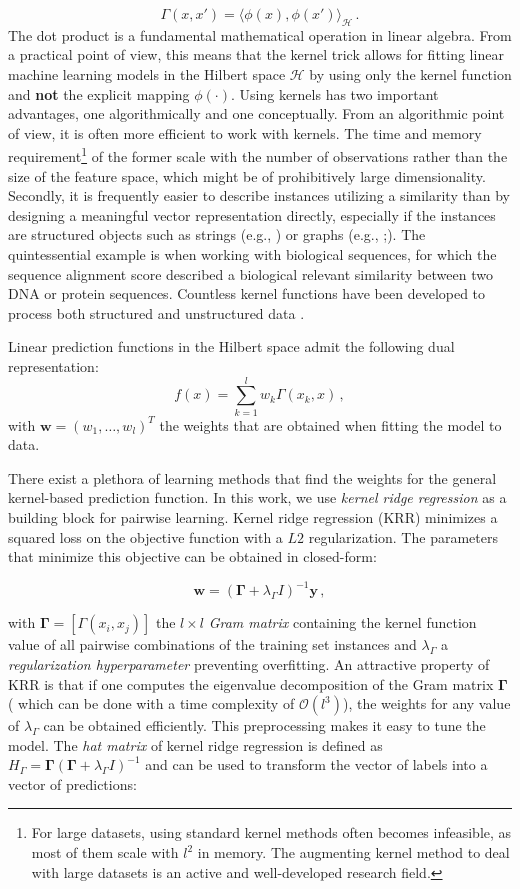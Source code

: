 \documentclass[
]{article}
\begin{document}
\[
\Gamma(x,x') = \langle \phi(x),\phi(x')\rangle_\mathcal{H}\,.
\] The dot product is a fundamental mathematical operation in linear
algebra. From a practical point of view, this means that the kernel
trick allows for fitting linear machine learning models in the Hilbert
space \(\mathcal{H}\) by using only the kernel function and \textbf{not}
the explicit mapping \(\phi(\cdot)\). Using kernels has two important
advantages, one algorithmically and one conceptually. From an
algorithmic point of view, it is often more efficient to work with
kernels. The time and memory requirement\footnote{For large datasets,
  using standard kernel methods often becomes infeasible, as most of
  them scale with \(l^2\) in memory. The augmenting kernel method to
  deal with large datasets is an active and well-developed research
  field.} of the former scale with the number of observations rather
than the size of the feature space, which might be of prohibitively
large dimensionality. Secondly, it is frequently easier to describe
instances utilizing a similarity than by designing a meaningful vector
representation directly, especially if the instances are structured
objects such as strings (e.g., \citet{Vishwanathan2004}) or graphs
(e.g., \citet{Lafferty2002};\citet{Nikolentzos2019}). The quintessential
example is when working with biological sequences, for which the
sequence alignment score described a biological relevant similarity
between two DNA or protein sequences. Countless kernel functions have
been developed to process both structured and unstructured data
\citep{Shawe-Taylor2004}.

Linear prediction functions in the Hilbert space admit the following
dual representation: \[
f(x) = \sum_{k=1}^l w_k \Gamma(x_k,x)\,,
\] with \(\mathbf{w} = (w_1,\ldots, w_l)^T\) the weights that are
obtained when fitting the model to data.

There exist a plethora of learning methods that find the weights for the
general kernel-based prediction function. In this work, we use
\emph{kernel ridge regression} as a building block for pairwise
learning. Kernel ridge regression (KRR) minimizes a squared loss on the
objective function with a \(L2\) regularization. The parameters that
minimize this objective can be obtained in closed-form:

\[
\mathbf{w} = (\mathbf{\Gamma}+\lambda_\Gamma I)^{-1}\mathbf{y}\,,
\]

with \(\mathbf{\Gamma}=[\Gamma(x_i,x_j)]\) the \(l\times l\) \emph{Gram
matrix} containing the kernel function value of all pairwise
combinations of the training set instances and \(\lambda_\Gamma\) a
\emph{regularization hyperparameter} preventing overfitting. An
attractive property of KRR is that if one computes the eigenvalue
decomposition of the Gram matrix \(\mathbf{\Gamma}\) ( which can be done
with a time complexity of \(\mathcal{O}(l^3)\)), the weights for any
value of \(\lambda_\Gamma\) can be obtained efficiently. This
preprocessing makes it easy to tune the model. The \emph{hat matrix} of
kernel ridge regression is defined as
\(H_\Gamma=\mathbf{\Gamma}(\mathbf{\Gamma}+\lambda_\Gamma I)^{-1}\) and
can be used to transform the vector of labels into a vector of
predictions:
\end{document}
